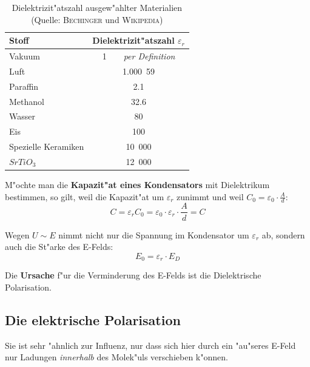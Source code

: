 \begin{table}
   \centering
   \begin{tabular}{l c}
\toprule
      \textbf{Stoff} & \textbf{Dielektrizit"atszahl $\varepsilon_r$}\\
\midrule
Vakuum & 1 ~ ~ \emph{per Definition}\\
Luft & 1.000\, 59\\
Paraffin & 2.1\\
Methanol & 32.6\\
Wasser & 80\\
Eis & 100\\
Spezielle Keramiken & 10\, 000\\
$SrTiO_3$ & 12\, 000\\
\bottomrule
   \end{tabular}
   \caption{Dielektrizit"atszahl ausgew"ahlter Materialien (Quelle:
     \textsc{Bechinger} und \textsc{Wikipedia})}
   \label{tab_dielektrizitaetszahl}
\end{table}



M"ochte man die \textbf{Kapazit"at eines Kondensators} mit Dielektrikum
bestimmen, so gilt, weil die Kapazit"at um $\varepsilon_r$ zunimmt und
weil $C_0 = \varepsilon_0 \cdot \frac{A}{d}$:
\begin{equation}
   \label{eqn_kondensator_dielektrikum}
   C = \varepsilon_r C_0 = \boxed{  \varepsilon_0 \cdot \varepsilon_r \cdot
   \frac{A}{d} = C  }
\end{equation}



\bigskip
\begin{Wichtig}
   Wegen $U \sim E$ nimmt nicht nur die Spannung im Kondensator um
   $\varepsilon_r$ ab, sondern auch die St"arke des E-Felds:
   \begin{equation*}
      E_0 = \varepsilon_r \cdot E_D
   \end{equation*}
\end{Wichtig}

Die \textbf{Ursache} f"ur die Verminderung des E-Felds ist die
{Dielektrische Polarisation}.





\subsection{Die elektrische Polarisation}
\label{kap_dielektrische-polarisation}

Sie ist sehr "ahnlich zur Influenz, nur dass sich hier durch ein
"au"seres E-Feld nur Ladungen \emph{innerhalb} des Molek"uls verschieben
k"onnen.

